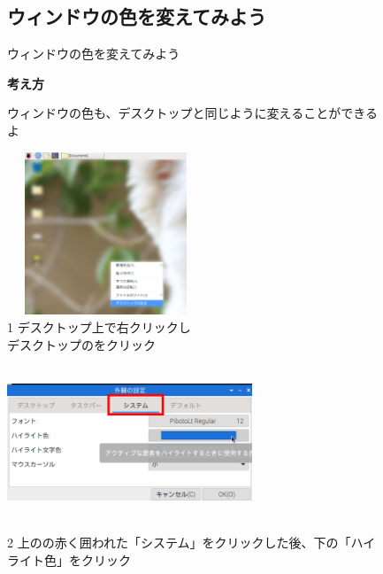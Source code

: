 \documentclass[a4paper,12pt]{jarticle}
\begin{document}
\bigskip

\clearpage

\begin{figure}
  \subsection{\theExercise ウィンドウの色を変えてみよう}
  ウィンドウの色を変えてみよう

  \textbf{考え方}


  \bigskip



  \centering
  \begin{minipage}{\textwidth}
    \begin{minipage}{7.737cm}
      ウィンドウの色も、デスクトップと同じように変えることができるよ
      \begin{minipage}{7.739cm}
        \includegraphics[width=5.892cm,height=4.864cm]{textbook-img107.png}\\
        1 デスクトップ上で右クリックし\\
        デスクトップのをクリック
      \end{minipage}
    \end{minipage}
    \begin{minipage}{2.582cm}
    \end{minipage}
    \begin{minipage}{7.737cm}
      \includegraphics[width=7.324cm,height=4.539cm]{textbook-img1001.png}\\
      \begin{minipage}{8.035cm}
        2 上のの赤く囲われた「システム」をクリックした後、下の「ハイライト色」をクリック
      \end{minipage}
    \end{minipage}


\end{minipage}
\end{figure}
\end{document}
